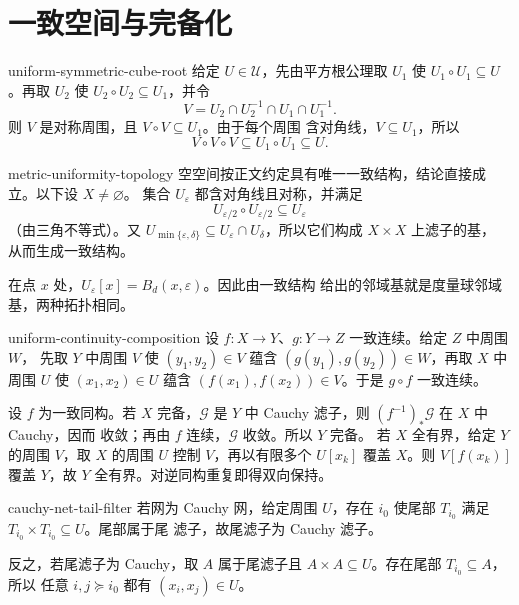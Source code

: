 \chapter{一致空间与完备化}
\label{chap:uniform-spaces-solutions}

\begin{solution}{uniform-symmetric-cube-root}
给定 \(U\in\mathcal U\)，先由平方根公理取 \(U_1\) 使
\(U_1\circ U_1\subseteq U\)。再取 \(U_2\) 使
\(U_2\circ U_2\subseteq U_1\)，并令
\[
 V=U_2\cap U_2^{-1}\cap U_1\cap U_1^{-1}.
\]
则 \(V\) 是对称周围，且 \(V\circ V\subseteq U_1\)。由于每个周围
含对角线，\(V\subseteq U_1\)，所以
\[
 V\circ V\circ V\subseteq U_1\circ U_1\subseteq U.
\]
\end{solution}

\begin{solution}{metric-uniformity-topology}
空空间按正文约定具有唯一一致结构，结论直接成立。以下设 \(X\ne\varnothing\)。
集合 \(U_\varepsilon\) 都含对角线且对称，并满足
\[
 U_{\varepsilon/2}\circ U_{\varepsilon/2}\subseteq U_\varepsilon
\]
（由三角不等式）。又
\(U_{\min\{\varepsilon,\delta\}}\subseteq
U_\varepsilon\cap U_\delta\)，所以它们构成 \(X\times X\) 上滤子的基，
从而生成一致结构。

在点 \(x\) 处，\(U_\varepsilon[x]=B_d(x,\varepsilon)\)。因此由一致结构
给出的邻域基就是度量球邻域基，两种拓扑相同。
\end{solution}

\begin{solution}{uniform-continuity-composition}
设 \(f:X\to Y\)、\(g:Y\to Z\) 一致连续。给定 \(Z\) 中周围 \(W\)，
先取 \(Y\) 中周围 \(V\) 使 \((y_1,y_2)\in V\) 蕴含
\((g(y_1),g(y_2))\in W\)，再取 \(X\) 中周围 \(U\) 使
\((x_1,x_2)\in U\) 蕴含 \((f(x_1),f(x_2))\in V\)。于是
\(g\circ f\) 一致连续。

设 \(f\) 为一致同构。若 \(X\) 完备，\(\mathcal G\) 是 \(Y\) 中
Cauchy 滤子，则 \((f^{-1})_*\mathcal G\) 在 \(X\) 中 Cauchy，因而
收敛；再由 \(f\) 连续，\(\mathcal G\) 收敛。所以 \(Y\) 完备。
若 \(X\) 全有界，给定 \(Y\) 的周围 \(V\)，取 \(X\) 的周围 \(U\)
控制 \(V\)，再以有限多个 \(U[x_k]\) 覆盖 \(X\)。则
\(V[f(x_k)]\) 覆盖 \(Y\)，故 \(Y\) 全有界。对逆同构重复即得双向保持。
\end{solution}

\begin{solution}{cauchy-net-tail-filter}
若网为 Cauchy 网，给定周围 \(U\)，存在 \(i_0\) 使尾部
\(T_{i_0}\) 满足 \(T_{i_0}\times T_{i_0}\subseteq U\)。尾部属于尾
滤子，故尾滤子为 Cauchy 滤子。

反之，若尾滤子为 Cauchy，取 \(A\) 属于尾滤子且
\(A\times A\subseteq U\)。存在尾部 \(T_{i_0}\subseteq A\)，所以
任意 \(i,j\succcurlyeq i_0\) 都有 \((x_i,x_j)\in U\)。
\end{solution}

